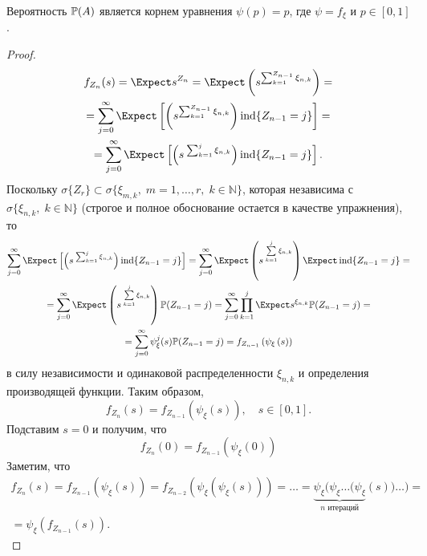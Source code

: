 \begin{lem}
	\label{lem1}
	Вероятность $\mathbb{P}(A)$ является корнем уравнения $\psi(p) = p$, где $\psi = f_{\xi}$ и $p \in [0, 1]$.
\end{lem}

\begin{proof}

	\begin{multline*}
		f_{Z_{n}}(s) = \Expect s^{Z_{n}} = \Expect \left(s^{\sum_{k=1}^{Z_{n-1}} \xi_{n, k}}\right) =\\
		= \sum_{j=0}^{\bes} \Expect \left[ \left( s^{\sum_{k=1}^{Z_{n-1}} \xi_{n, k}} \right)	\ind \lbrace Z_{n-1} = j \rbrace \right] = \\ = \sum_{j=0}^{\bes} \Expect \left[ \left( s \: ^{\sum_{k=1}^{j} \xi_{n, k}} \right)	\ind \lbrace Z_{n-1} = j \rbrace \right].
	\end{multline*}
	Поскольку $\sigma \lbrace Z_{r} \rbrace \subset \sigma \lbrace \xi_{m, k}, \; m = 1, \ldots, r, \; k \in \mathbb{N} \rbrace$, которая независима с $\sigma \lbrace \xi_{n, k}, \; k \in \mathbb{N} \rbrace$ (строгое и полное обоснование остается в качестве упражнения), то
	\begin{multline*}
		\sum_{j=0}^{\bes} \Expect \left[ \left( s \: ^{\sum_{k=1}^{j} \xi_{n, k}} \right)	\ind \lbrace Z_{n-1} = j \rbrace \right]	=	\sum\limits_{j=0}^{\bes} \Expect \left(s \: ^{\sum\limits_{k=1}^{j} \xi_{n, k}}\right) \Expect \ind \lbrace Z_{n-1} = j \rbrace	= \\ = \sum\limits_{j=0}^{\bes} \Expect \left(s \: ^{\sum\limits_{k=1}^{j} \xi_{n, k}}\right) \Pbb ( Z_{n-1} = j ) = \sum\limits_{j=0}^{\bes} \prod\limits_{k=1}^{j} \Expect s^{\xi_{n, k}} \Pbb (Z_{n-1} = j) = \\ = \sum\limits_{j=0}^{\bes} \psi_{\xi}^{j} (s) \Pbb (Z_{n-1} = j)	=	f_{Z_{n-1}} \left(\psi_{\xi} \left(s \right) \right)
	\end{multline*}
	в силу независимости и одинаковой распределенности $\xi_{n, k}$ и определения производящей функции.
Таким образом,
	\begin{equation*}
		f_{Z_{n}} (s) = f_{Z_{n-1}} \left( \psi_{\xi} \left(s \right)\right){,}\quad s \in [0, 1]{.}
	\end{equation*}
	Подставим $s = 0$ и получим, что
	\begin{equation*}
		f_{Z_{n}} (0) = f_{Z_{n-1}} \left( \psi_{\xi} \left(0 \right)\right)
	\end{equation*}
	Заметим, что
	\begin{multline*}
		f_{Z_{n}}(s) = f_{Z_{n-1}}(\psi_{\xi}(s)) = f_{Z_{n-2}} \left(\psi_{\xi} \left( \psi_{\xi} \left(s \right) \right) \right) = \ldots = \underbrace{\psi_{\xi} (\psi_{\xi} \ldots (\psi_{\xi}}_{\text{$n$ итераций}}(s)) \ldots ) = \\ = \psi_{\xi} (f_{Z_{n-1}} (s)){.}

\end{multline*}
\end{proof}
